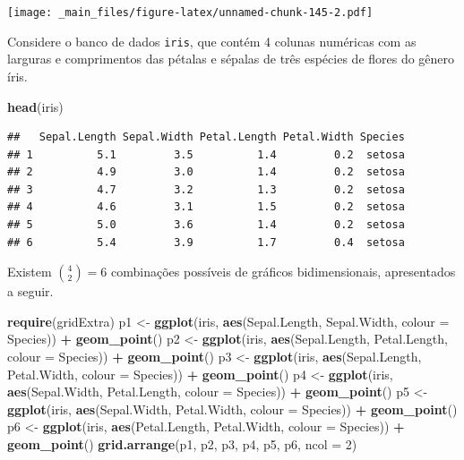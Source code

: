 \documentclass[
]{book}
\newenvironment{Shaded}{\begin{snugshade}}{\end{snugshade}}
\newcommand{\DataTypeTok}[1]{\textcolor[rgb]{0.13,0.29,0.53}{#1}}
\newcommand{\DecValTok}[1]{\textcolor[rgb]{0.00,0.00,0.81}{#1}}
\newcommand{\KeywordTok}[1]{\textcolor[rgb]{0.13,0.29,0.53}{\textbf{#1}}}
\newcommand{\NormalTok}[1]{#1}
\newcommand{\OperatorTok}[1]{\textcolor[rgb]{0.81,0.36,0.00}{\textbf{#1}}}
\newcommand{\StringTok}[1]{\textcolor[rgb]{0.31,0.60,0.02}{#1}}
\theoremstyle{definition}
\theoremstyle{definition}
\theoremstyle{definition}
\theoremstyle{remark}
\begin{document}
\texttt{[image: \_main\_files/figure-latex/unnamed-chunk-145-2.pdf]}

Considere o banco de dados \texttt{iris}, que contém 4 colunas numéricas com as larguras e comprimentos das pétalas e sépalas de três espécies de flores do gênero íris.

\begin{Shaded}
\begin{Highlighting}[]
\KeywordTok{head}\NormalTok{(iris)}
\end{Highlighting}
\end{Shaded}

\begin{verbatim}
##   Sepal.Length Sepal.Width Petal.Length Petal.Width Species
## 1          5.1         3.5          1.4         0.2  setosa
## 2          4.9         3.0          1.4         0.2  setosa
## 3          4.7         3.2          1.3         0.2  setosa
## 4          4.6         3.1          1.5         0.2  setosa
## 5          5.0         3.6          1.4         0.2  setosa
## 6          5.4         3.9          1.7         0.4  setosa
\end{verbatim}

Existem \({4 \choose 2} = 6\) combinações possíveis de gráficos bidimensionais, apresentados a seguir.

\begin{Shaded}
\begin{Highlighting}[]
\KeywordTok{require}\NormalTok{(gridExtra)}
\NormalTok{p1 \textless{}{-}}\StringTok{ }\KeywordTok{ggplot}\NormalTok{(iris, }\KeywordTok{aes}\NormalTok{(Sepal.Length, Sepal.Width, }\DataTypeTok{colour =}\NormalTok{ Species)) }\OperatorTok{+}\StringTok{ }\KeywordTok{geom\_point}\NormalTok{()}
\NormalTok{p2 \textless{}{-}}\StringTok{ }\KeywordTok{ggplot}\NormalTok{(iris, }\KeywordTok{aes}\NormalTok{(Sepal.Length, Petal.Length, }\DataTypeTok{colour =}\NormalTok{ Species)) }\OperatorTok{+}\StringTok{ }\KeywordTok{geom\_point}\NormalTok{()}
\NormalTok{p3 \textless{}{-}}\StringTok{ }\KeywordTok{ggplot}\NormalTok{(iris, }\KeywordTok{aes}\NormalTok{(Sepal.Length, Petal.Width, }\DataTypeTok{colour =}\NormalTok{ Species)) }\OperatorTok{+}\StringTok{ }\KeywordTok{geom\_point}\NormalTok{()}
\NormalTok{p4 \textless{}{-}}\StringTok{ }\KeywordTok{ggplot}\NormalTok{(iris, }\KeywordTok{aes}\NormalTok{(Sepal.Width, Petal.Length, }\DataTypeTok{colour =}\NormalTok{ Species)) }\OperatorTok{+}\StringTok{ }\KeywordTok{geom\_point}\NormalTok{()}
\NormalTok{p5 \textless{}{-}}\StringTok{ }\KeywordTok{ggplot}\NormalTok{(iris, }\KeywordTok{aes}\NormalTok{(Sepal.Width, Petal.Width, }\DataTypeTok{colour =}\NormalTok{ Species)) }\OperatorTok{+}\StringTok{ }\KeywordTok{geom\_point}\NormalTok{()}
\NormalTok{p6 \textless{}{-}}\StringTok{ }\KeywordTok{ggplot}\NormalTok{(iris, }\KeywordTok{aes}\NormalTok{(Petal.Length, Petal.Width, }\DataTypeTok{colour =}\NormalTok{ Species)) }\OperatorTok{+}\StringTok{ }\KeywordTok{geom\_point}\NormalTok{()}
\KeywordTok{grid.arrange}\NormalTok{(p1, p2, p3, p4, p5, p6, }\DataTypeTok{ncol =} \DecValTok{2}\NormalTok{)}
\end{Highlighting}
\end{Shaded}
\end{document}
